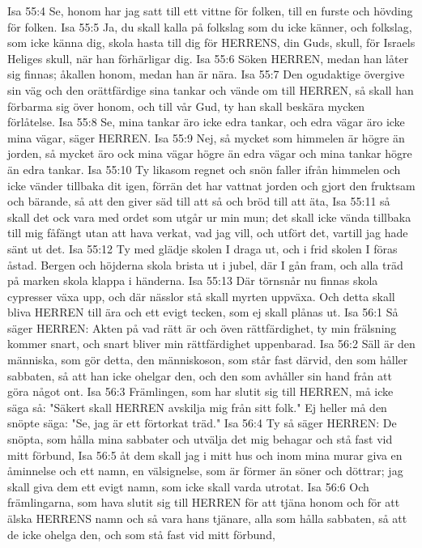 Isa 55:4  Se, honom har jag satt till ett vittne för folken, till en furste och hövding för folken.
Isa 55:5  Ja, du skall kalla på folkslag som du icke känner, och folkslag, som icke känna dig, skola hasta till dig för HERRENS, din Guds, skull, för Israels Heliges skull, när han förhärligar dig.
Isa 55:6  Söken HERREN, medan han låter sig finnas; åkallen honom, medan han är nära.
Isa 55:7  Den ogudaktige övergive sin väg och den orättfärdige sina tankar och vände om till HERREN, så skall han förbarma sig över honom, och till vår Gud, ty han skall beskära mycken förlåtelse.
Isa 55:8  Se, mina tankar äro icke edra tankar, och edra vägar äro icke mina vägar, säger HERREN.
Isa 55:9  Nej, så mycket som himmelen är högre än jorden, så mycket äro ock mina vägar högre än edra vägar och mina tankar högre än edra tankar.
Isa 55:10  Ty likasom regnet och snön faller ifrån himmelen och icke vänder tillbaka dit igen, förrän det har vattnat jorden och gjort den fruktsam och bärande, så att den giver säd till att så och bröd till att äta,
Isa 55:11  så skall det ock vara med ordet som utgår ur min mun; det skall icke vända tillbaka till mig fåfängt utan att hava verkat, vad jag vill, och utfört det, vartill jag hade sänt ut det.
Isa 55:12  Ty med glädje skolen I draga ut, och i frid skolen I föras åstad. Bergen och höjderna skola brista ut i jubel, där I gån fram, och alla träd på marken skola klappa i händerna.
Isa 55:13  Där törnsnår nu finnas skola cypresser växa upp, och där nässlor stå skall myrten uppväxa. Och detta skall bliva HERREN till ära och ett evigt tecken, som ej skall plånas ut.
Isa 56:1  Så säger HERREN: Akten på vad rätt är och öven rättfärdighet, ty min frälsning kommer snart, och snart bliver min rättfärdighet uppenbarad.
Isa 56:2  Säll är den människa, som gör detta, den människoson, som står fast därvid, den som håller sabbaten, så att han icke ohelgar den, och den som avhåller sin hand från att göra något ont.
Isa 56:3  Främlingen, som har slutit sig till HERREN, må icke säga så: "Säkert skall HERREN avskilja mig från sitt folk." Ej heller må den snöpte säga: "Se, jag är ett förtorkat träd."
Isa 56:4  Ty så säger HERREN: De snöpta, som hålla mina sabbater och utvälja det mig behagar och stå fast vid mitt förbund,
Isa 56:5  åt dem skall jag i mitt hus och inom mina murar giva en åminnelse och ett namn, en välsignelse, som är förmer än söner och döttrar; jag skall giva dem ett evigt namn, som icke skall varda utrotat.
Isa 56:6  Och främlingarna, som hava slutit sig till HERREN för att tjäna honom och för att älska HERRENS namn och så vara hans tjänare, alla som hålla sabbaten, så att de icke ohelga den, och som stå fast vid mitt förbund,
